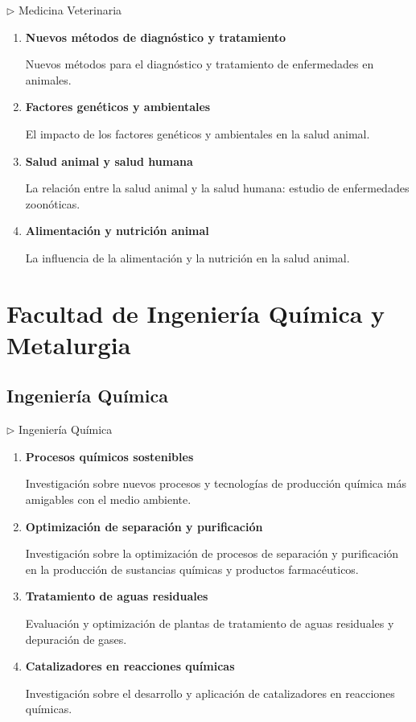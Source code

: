 \documentclass[12pt,a4paper]{article}
\begin{document}
\begin{careerbox}{$\triangleright$ Medicina Veterinaria}
	\begin{enumerate}
		\item \textbf{Nuevos métodos de diagnóstico y tratamiento}
		
		Nuevos métodos para el diagnóstico y tratamiento de enfermedades en animales.
		
		\item \textbf{Factores genéticos y ambientales}
		
		El impacto de los factores genéticos y ambientales en la salud animal.
		
		\item \textbf{Salud animal y salud humana}
		
		La relación entre la salud animal y la salud humana: estudio de enfermedades zoonóticas.
		
		\item \textbf{Alimentación y nutrición animal}
		
		La influencia de la alimentación y la nutrición en la salud animal.
	\end{enumerate}
\end{careerbox}



\section{Facultad de Ingeniería Química y Metalurgia}
\subsection{Ingeniería Química}

\begin{careerbox}{$\triangleright$ Ingeniería Química}
	\begin{enumerate}
		\item \textbf{Procesos químicos sostenibles}
		
		Investigación sobre nuevos procesos y tecnologías de producción química más amigables con el medio ambiente.
		
		\item \textbf{Optimización de separación y purificación}
		
		Investigación sobre la optimización de procesos de separación y purificación en la producción de sustancias químicas y productos farmacéuticos.
		
		\item \textbf{Tratamiento de aguas residuales}
		
		Evaluación y optimización de plantas de tratamiento de aguas residuales y depuración de gases.
		
		\item \textbf{Catalizadores en reacciones químicas}
		
		Investigación sobre el desarrollo y aplicación de catalizadores en reacciones químicas.
	\end{enumerate}
\end{careerbox}
\end{document}
